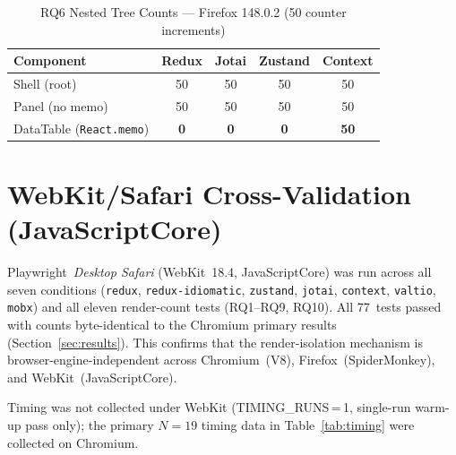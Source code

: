 \documentclass[conference]{IEEEtran}
\newcommand{\code}[1]{\texttt{\small #1}}
\begin{document}
\begin{table}[t]
\caption{RQ6 Nested Tree Counts --- Firefox 148.0.2 (50 counter increments)}
\label{tab:ff-rq6}
\begin{center}
\scriptsize
\setlength{\tabcolsep}{4pt}
\begin{tabular}{lcccc}
\toprule
\textbf{Component} & \textbf{Redux} & \textbf{Jotai} & \textbf{Zustand} & \textbf{Context} \\
\midrule
Shell (root)                  & 50 & 50 & 50 & 50 \\
Panel (no memo)               & 50 & 50 & 50 & 50 \\
DataTable (\code{React.memo}) & \textbf{0} & \textbf{0} & \textbf{0} & \textbf{50} \\
\bottomrule
\end{tabular}
\end{center}
\end{table}

\section{WebKit/Safari Cross-Validation (JavaScriptCore)}
\label{app:webkit}

Playwright~\textit{Desktop Safari} (WebKit~18.4, JavaScriptCore)
was run across all seven conditions
(\code{redux}, \code{redux-idiomatic}, \code{zustand}, \code{jotai},
\code{context}, \code{valtio}, \code{mobx}) and all eleven
render-count tests (RQ1--RQ9, RQ10). All 77~tests passed with counts
byte-identical to the Chromium primary results
(Section~\ref{sec:results}).  This confirms that the render-isolation
mechanism is browser-engine-independent across Chromium~(V8),
Firefox~(SpiderMonkey), and WebKit~(JavaScriptCore).

Timing was not collected under WebKit (TIMING\_RUNS\,=\,1,
single-run warm-up pass only); the primary
$N{=}19$ timing data in Table~\ref{tab:timing} were collected on
Chromium.
\end{document}
